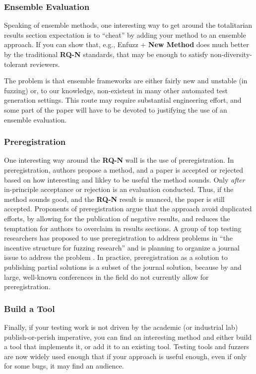 \documentclass[sigplan,review]{acmart}
\begin{document}
\subsubsection{Ensemble Evaluation}

Speaking of ensemble methods, one interesting way to get around the totalitarian results section
expectation is to ``cheat'' by adding your method to an ensemble
approach.  If you can show that, e.g., Enfuzz + {\bf New Method} does much
better by the traditional {\bf RQ-N} standards, that may be enough to
satisfy non-diversity-tolerant reviewers.

The problem is that ensemble frameworks are either fairly new and
unstable (in fuzzing) or, to our knowledge, non-existent in many other
automated test generation settings.  This route may require
substantial engineering effort, and some part of the paper will have
to be devoted to justifying the use of an ensemble evaluation.

\subsubsection{Preregistration}

One interesting way around the {\bf RQ-N} wall is the use of
preregistration.  In preregistration, authors propose a method, and
a paper is accepted or rejected based on how interesting and likley to
be useful the method sounds.  Only \emph{after} in-principle
acceptance or rejection is an evaluation conducted.  Thus, if the
method sounds good, and the {\bf RQ-N} result is nuanced, the paper is
still accepted.  Proponents of preregistration argue that the approach
avoid duplicated efforts, by allowing for the publication of negative
results, and reduces the temptation for authors to overclaim in
results sections.  A group of top testing researchers has proposed to
use preregistration to address problems in ``the incentive structure
for fuzzing research'' and is planning to organize a journal issue to
address the problem \cite{special}.  In practice, preregistration as a solution to
publishing partial solutions is a subset of the journal solution,
because by and large, well-known conferences in the field do not currently allow
for preregistration.


\subsubsection{Build a Tool}

Finally, if your testing work is not driven by the academic (or
industrial lab) publish-or-perish imperative, you can find an
interesting method and either build a tool that implements it, or add
it to an existing tool.  Testing tools and fuzzers are now widely used
enough that if your approach is useful enough, even if only for some
bugs, it may find an audience.
\end{document}
